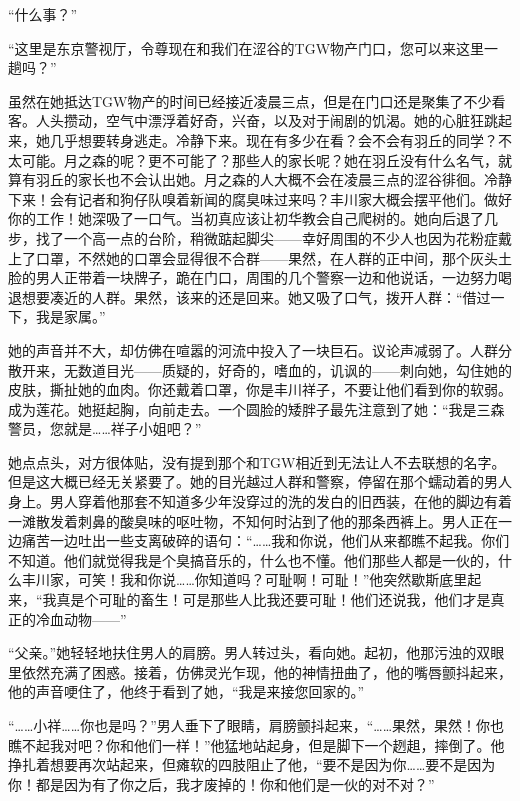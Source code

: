 \documentclass{article}
\begin{document}
“什么事？”



“这里是东京警视厅，令尊现在和我们在涩谷的TGW物产门口，您可以来这里一趟吗？”



\newpage



虽然在她抵达TGW物产的时间已经接近凌晨三点，但是在门口还是聚集了不少看客。人头攒动，空气中漂浮着好奇，兴奋，以及对于闹剧的饥渴。她的心脏狂跳起来，她几乎想要转身逃走。冷静下来。现在有多少在看？会不会有羽丘的同学？不太可能。月之森的呢？更不可能了？那些人的家长呢？她在羽丘没有什么名气，就算有羽丘的家长也不会认出她。月之森的人大概不会在凌晨三点的涩谷徘徊。冷静下来！会有记者和狗仔队嗅着新闻的腐臭味过来吗？丰川家大概会摆平他们。做好你的工作！她深吸了一口气。当初真应该让初华教会自己爬树的。她向后退了几步，找了一个高一点的台阶，稍微踮起脚尖——幸好周围的不少人也因为花粉症戴上了口罩，不然她的口罩会显得很不合群——果然，在人群的正中间，那个灰头土脸的男人正带着一块牌子，跪在门口，周围的几个警察一边和他说话，一边努力喝退想要凑近的人群。果然，该来的还是回来。她又吸了口气，拨开人群：“借过一下，我是家属。”



她的声音并不大，却仿佛在喧嚣的河流中投入了一块巨石。议论声减弱了。人群分散开来，无数道目光——质疑的，好奇的，嗜血的，讥讽的——刺向她，勾住她的皮肤，撕扯她的血肉。你还戴着口罩，你是丰川祥子，不要让他们看到你的软弱。成为莲花。她挺起胸，向前走去。一个圆脸的矮胖子最先注意到了她：“我是三森警员，您就是……祥子小姐吧？”



她点点头，对方很体贴，没有提到那个和TGW相近到无法让人不去联想的名字。但是这大概已经无关紧要了。她的目光越过人群和警察，停留在那个蠕动着的男人身上。男人穿着他那套不知道多少年没穿过的洗的发白的旧西装，在他的脚边有着一滩散发着刺鼻的酸臭味的呕吐物，不知何时沾到了他的那条西裤上。男人正在一边痛苦一边吐出一些支离破碎的语句：“……我和你说，他们从来都瞧不起我。你们不知道。他们就觉得我是个臭搞音乐的，什么也不懂。他们那些人都是一伙的，什么丰川家，可笑！我和你说……你知道吗？可耻啊！可耻！”他突然歇斯底里起来，“我真是个可耻的畜生！可是那些人比我还要可耻！他们还说我，他们才是真正的冷血动物——”



“父亲。”她轻轻地扶住男人的肩膀。男人转过头，看向她。起初，他那污浊的双眼里依然充满了困惑。接着，仿佛灵光乍现，他的神情扭曲了，他的嘴唇颤抖起来，他的声音哽住了，他终于看到了她，“我是来接您回家的。”



“……小祥……你也是吗？”男人垂下了眼睛，肩膀颤抖起来，“……果然，果然！你也瞧不起我对吧？你和他们一样！”他猛地站起身，但是脚下一个趔趄，摔倒了。他挣扎着想要再次站起来，但瘫软的四肢阻止了他，“要不是因为你……要不是因为你！都是因为有了你之后，我才废掉的！你和他们是一伙的对不对？”
\end{document}
